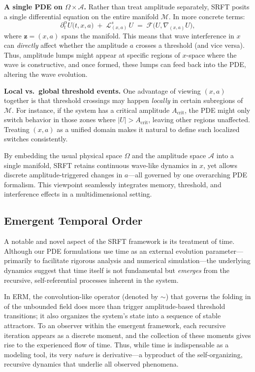 \documentclass[12pt]{article}
\begin{document}
\medskip

\noindent
\textbf{A single PDE on \(\Omega \times \mathcal{A}\).}
Rather than treat amplitude separately, SRFT posits a single differential 
equation on the entire manifold $\mathcal{M}$. In more concrete terms:
\[
  \partial_t^\alpha U\bigl(t, x, a\bigr)
  \;+\;
  \mathcal{L}_{(x,a)}^{s} \,U
  \;=\;
  \mathcal{F}\bigl(U, \nabla_{(x,a)} U\bigr),
\]
where $\mathbf{z} = (x,a)$ spans the manifold. This means that wave interference 
in $x$ can \emph{directly} affect whether the amplitude $a$ crosses a threshold 
(and vice versa). Thus, amplitude lumps might appear at specific regions of $x$-space 
where the wave is constructive, and once formed, these lumps can feed back into 
the PDE, altering the wave evolution.

\medskip

\noindent
\textbf{Local vs.\ global threshold events.}
One advantage of viewing $(x,a)$ together is that threshold crossings may happen
\emph{locally} in certain subregions of $\mathcal{M}$. For instance, if the system 
has a critical amplitude $A_{\mathrm{crit}}$, the PDE might only switch behavior 
in those zones where $|U| > A_{\mathrm{crit}}$, leaving other regions unaffected.
Treating $(x,a)$ as a unified domain makes it natural to define such localized
switches consistently.

\medskip

\noindent
By embedding the usual physical space $\Omega$ and the amplitude space $\mathcal{A}$
into a single manifold, SRFT retains continuous wave-like dynamics in $x$, yet allows
discrete amplitude-triggered changes in $a$—all governed by one overarching PDE
formalism. This viewpoint seamlessly integrates memory, threshold, and interference
effects in a multidimensional setting.

\subsection{Emergent Temporal Order}
A notable and novel aspect of the SRFT framework is its treatment of time. Although our PDE formulations use time as an external evolution parameter—primarily to facilitate rigorous analysis and numerical simulation—the underlying dynamics suggest that time itself is not fundamental but \emph{emerges} from the recursive, self-referential processes inherent in the system. 

In ERM, the convolution-like operator (denoted by $\sim$) that governs the folding in of the unbounded field does more than trigger amplitude-based threshold transitions; it also organizes the system’s state into a sequence of stable attractors. To an observer within the emergent framework, each recursive iteration appears as a discrete moment, and the collection of these moments gives rise to the experienced flow of time. Thus, while time is indispensable as a modeling tool, its very \emph{nature} is derivative—a byproduct of the self-organizing, recursive dynamics that underlie all observed phenomena.
\end{document}
